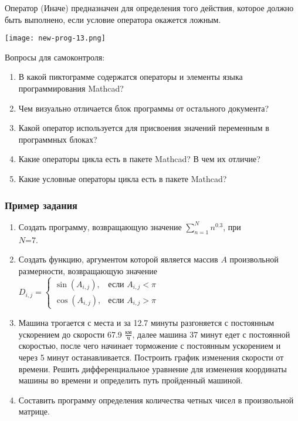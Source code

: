 Оператор  (Иначе) предназначен для определения того действия, которое должно быть выполнено, если условие оператора  окажется ложным.


\begin{center}
	\texttt{[image: new-prog-13.png]}
\end{center}


Вопросы для самоконтроля:
\begin{enumerate}
	\item В какой пиктограмме содержатся операторы и элементы языка программирования Mathcad?
	\item Чем визуально отличается блок программы от остального документа?
	\item Какой оператор используется для присвоения значений переменным в программных блоках?
	\item Какие операторы цикла есть в пакете Mathcad? В чем их отличие?
	\item Какие условные операторы цикла есть в пакете Mathcad?
\end{enumerate}

\subsubsection*{Пример задания}
\begin{enumerate}
	\item  Создать программу, возвращающую значение $\sum\limits_{n=1}^{N} {n}^{0.3}$, при \\$N$=7. 
	\item Создать функцию, аргументом которой является массив $A$ произвольной размерности, возвращающую значение \\ $D_{i,j}=\begin{cases} \sin(A_{i,j}), & \text{если } A_{i,j}<\pi \\ \cos(A_{i,j}), & \text{если } A_{i,j}>\pi \end{cases}                     $ 
	\item Машина трогается с места и за 12.7 минуты разгоняется с постоянным ускорением до скорости 67.9 ${\frac{км}{ч}}$, далее машина   37 минут едет с постоянной скоростью, после чего начинает торможение с постоянным ускорением и через   5 минут останавливается. Построить график изменения скорости от времени. Решить дифференциальное уравнение для изменения координаты машины во времени и определить путь пройденный машиной. 
	\item Составить программу определения количества четных чисел в произвольной матрице.                                                                                                                                                                
	
\end{enumerate}